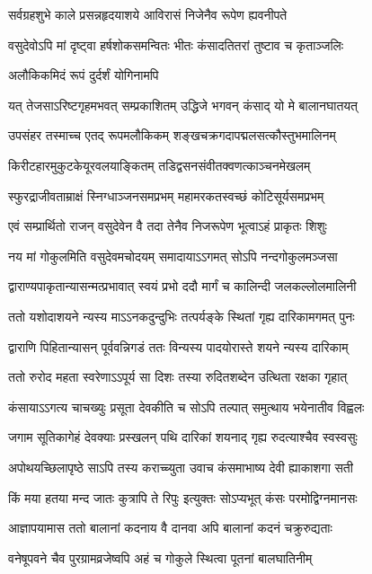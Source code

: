 \twolineshloka
{सर्वग्रहशुभे काले प्रसन्नहृदयाशये}
{आविरासं निजेनैव रूपेण ह्यवनीपते}%

\twolineshloka
{वसुदेवोऽपि मां दृष्ट्वा हर्षशोकसमन्वितः}
{भीतः कंसादतितरां तुष्टाव च कृताञ्जलिः}%

\onelineshloka
{अलौकिकमिदं रूपं दुर्दर्शं योगिनामपि}%

\twolineshloka
{यत् तेजसाऽरिष्टगृहमभवत् सम्प्रकाशितम्}
{उद्धिजे भगवन् कंसाद् यो मे बालानघातयत्}%

\twolineshloka
{उपसंहर तस्माच्च एतद् रूपमलौकिकम्}
{शङ्खचक्रगदापद्मलसत्कौस्तुभमालिनम्}%

\twolineshloka
{किरीटहारमुकुटकेयूरवलयाङ्कितम्}
{तडिद्वसनसंवीतक्वणत्काञ्चनमेखलम्}%

\twolineshloka
{स्फुरद्राजीवताम्राक्षं स्निग्धाञ्जनसमप्रभम्}
{महामरकतस्वच्छं कोटिसूर्यसमप्रभम्}%

\twolineshloka
{एवं सम्प्रार्थितो राजन् वसुदेवेन वै तदा}
{तेनैव निजरूपेण भूत्वाऽहं प्राकृतः शिशुः}%

\twolineshloka
{नय मां गोकुलमिति वसुदेवमचोदयम्}
{समादायाऽऽगमत् सोऽपि नन्दगोकुलमञ्जसा}%

\twolineshloka
{द्वाराण्यपाकृतान्यासन्मत्प्रभावात् स्वयं प्रभो}
{ददौ मार्गं च कालिन्दी जलकल्लोलमालिनी}%

\twolineshloka
{ततो यशोदाशयने न्यस्य माऽऽनकदुन्दुभिः}
{तत्पर्यङ्के स्थितां गृह्य दारिकामगमत् पुनः}%

\twolineshloka
{द्वाराणि पिहितान्यासन् पूर्ववन्निगडं ततः}
{विन्यस्य पादयोरास्ते शयने न्यस्य दारिकाम्}%

\twolineshloka
{ततो रुरोद महता स्वरेणाऽऽपूर्य सा दिशः}
{तस्या रुदितशब्देन उत्थिता रक्षका गृहात्}%

\twolineshloka
{कंसायाऽऽगत्य चाचख्युः प्रसूता देवकीति च}
{सोऽपि तल्पात् समुत्थाय भयेनातीव विह्वलः}%

\twolineshloka
{जगाम सूतिकागेहं देवक्याः प्रस्खलन् पथि}
{दारिकां शयनाद् गृह्य रुदत्याश्चैव स्वस्वसुः}%

\twolineshloka
{अपोथयच्छिलापृष्ठे साऽपि तस्य कराच्च्युता}
{उवाच कंसमाभाष्य देवी ह्याकाशगा सती}%

\twolineshloka
{किं मया हतया मन्द जातः कुत्रापि ते रिपुः}
{इत्युक्तः सोऽप्यभूत् कंसः परमोद्विग्नमानसः}%

\twolineshloka
{आज्ञापयामास ततो बालानां कदनाय वै}
{दानवा अपि बालानां कदनं चक्रुरुद्यताः}%

\twolineshloka
{वनेषूपवने चैव पुरग्रामव्रजेष्वपि}
{अहं च गोकुले स्थित्वा पूतनां बालघातिनीम्}%

